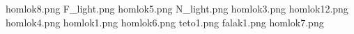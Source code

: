 homlok8.png
F_light.png
homlok5.png
N_light.png
homlok3.png
homlok12.png
homlok4.png
homlok1.png
homlok6.png
teto1.png
falak1.png
homlok7.png
